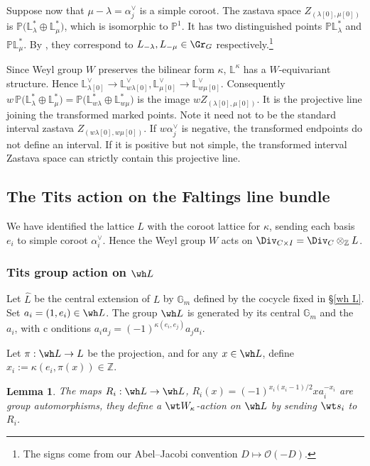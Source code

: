 \documentclass{amsart}
\numberwithin{equation}{section}
\numberwithin{figure}{section}
\newtheorem{lem}[thm]{Lemma}
\theoremstyle{definition}
\theoremstyle{remark}
\renewcommand{\b}[1]{\mathbb{#1}}
\begin{document}
Suppose now that $\mu-\lambda=\alpha_j^\vee$ is a simple coroot. The zastava space $Z_{(\lambda[0],\mu[0])}$ is $\b P\bigl(\b L_\lambda^*\oplus\b L_\mu^*\bigr)$, which is isomorphic to $\b P^1$. It has two distinguished points  $\b P\b L_\lambda^*$ and
$\b P\b L_\mu^*$. 
By \cite[Theorem~3.1.2]{finkelberg2023elliptic}, they correspond to $L_{-\lambda},L_{-\mu}\in \Gr_G$ respectively.\footnote{The signs come from our Abel–Jacobi convention \(D\mapsto\mathcal O(-D)\).}

Since Weyl group $W$ preserves the bilinear form $\kappa$,   $\b L^\kappa$ has a $W$-equivariant structure. Hence 
$
\mathbb L_{\lambda[0]}^\vee
\longrightarrow
\mathbb L_{w\lambda[0]}^\vee, \mathbb L_{\mu[0]}^\vee
\longrightarrow
\mathbb L_{w\mu[0]}^\vee.
$
Consequently
$ w\,
\b P\bigl(\b L_\lambda^*\oplus\b L_\mu^*\bigr)
=\b P\bigl(\b L_{w\lambda}^*\oplus\b L_{w\mu}^*\bigr)$ is the image $wZ_{(\lambda[0],\mu[0])}$. It is the projective line joining the transformed marked
points. Note it need not to be the standard interval zastava 
$Z_{(w\lambda[0],w\mu[0])}$. If \(w\alpha_j^\vee\) is negative, the transformed endpoints do not define an interval. If it is positive but not simple, the transformed interval Zastava space can strictly contain this projective line.

\subsection{The Tits action on the Faltings line bundle}
\label{subsec:tits-faltings}
We have identified the lattice $L$ with the coroot lattice for $\kappa$, sending each basis $e_i$ to simple coroot $\alpha_i^\vee$.
Hence the Weyl group $W$ acts on $\Div_{C\times I}=\Div_C\otimes_\b Z L$.

\subsubsection{Tits group action on $\wh L$}
Let \(\widehat L\) be the central extension of $L$ by $\b G_m$ defined by the cocycle fixed in \S\ref{wh L}. Set $a_i=(1,e_i)\in\wh L$. 
The group $\wh L$ is generated by its central $\b G_m$ and
the $a_i$, with c onditions
$a_i a_j=(-1)^{\kappa(e_i,e_j)}a_j a_i$.

Let $\pi:\wh L\to L$ be the projection, and for any $x\in \wh L$, define $x_i:=\kappa(e_i,\pi(x))\in \b Z$.

\begin{lem}
	\label{lem:tits-lattice-lift}
	The maps $R_i: \wh L\to \wh L$, $R_i(x)=(-1)^{x_i(x_i-1)/2}x a_i^{-x_i}$ are group automorphisms, they define a $\wt W_\kappa$-action on $\wh L$ by sending $\wt s_i$ to $R_i$.
\end{lem}
\end{document}
